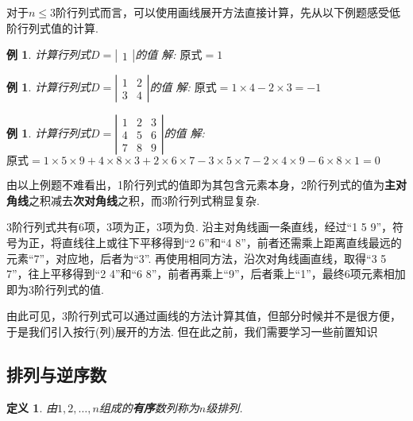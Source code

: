 \documentclass[12pt, a4paper, oneside]{ctexbook}
\newtheorem{definition}[theorem]{定义}
\newtheorem{example}[theorem]{例}
\begin{document}
对于$n \le 3$阶行列式而言，可以使用画线展开方法直接计算，先从以下例题感受低阶行列式值的计算. 
\begin{example}
    计算行列式$D=\left | \begin{matrix}
        1
    \end{matrix} \right |$的值
    \newline
    解: $\mbox{原式}=1$
\end{example}

\begin{example}
    计算行列式$D=\left | \begin{matrix}
        1 & 2 \\
        3 & 4
    \end{matrix} \right |$的值
    \newline
    解: $\mbox{原式}=1 \times 4 - 2 \times 3 = -1$
\end{example}

\begin{example}
    计算行列式$D=\left | \begin{matrix}
        1 & 2 & 3 \\
        4 & 5 & 6 \\
        7 & 8 & 9
    \end{matrix} \right |$的值
    \newline
    解: $\mbox{原式}=1 \times 5 \times 9 + 4 \times 8 \times 3 + 2 \times 6 \times 7 - 3 \times 5 \times 7 - 2 \times 4 \times 9 - 6 \times 8 \times 1=0$
\end{example}

由以上例题不难看出，1阶行列式的值即为其包含元素本身，2阶行列式的值为\textbf{主对角线}之积减去\textbf{次对角线}之积，而3阶行列式稍显复杂.


3阶行列式共有6项，3项为正，3项为负. 沿主对角线画一条直线，经过``1 5 9''，符号为正，将直线往上或往下平移得到``2 6''和``4 8''，前者还需乘上距离直线最远的元素``7''，对应地，后者为``3''. 
再使用相同方法，沿次对角线画直线，取得``3 5 7''，往上平移得到``2 4''和``6 8''，前者再乘上``9''，后者乘上``1''，最终6项元素相加即为3阶行列式的值. 


由此可见，3阶行列式可以通过画线的方法计算其值，但部分时候并不是很方便，于是我们引入按行(列)展开的方法. 但在此之前，我们需要学习一些前置知识

\subsection{排列与逆序数}
\begin{definition}
    由$1,2,\dots,n$组成的\textbf{有序}数列称为$n$级排列.
\end{definition}
\end{document}
